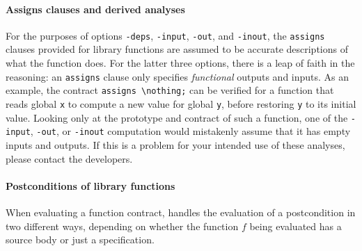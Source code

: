 \documentclass{frama-c-book}
\begin{document}
\paragraph{Assigns clauses and derived analyses}

For the purposes of options \lstinline|-deps|, \lstinline|-input|,
\lstinline|-out|, and \lstinline|-inout|, the \lstinline|assigns|
clauses provided for
library functions are assumed to be accurate descriptions of what the
function does. For the latter three options, there is a
leap of faith in the reasoning: an \lstinline|assigns| clause only
specifies {\em functional} outputs and inputs. As an example, the contract
\lstinline|assigns \nothing;| can be verified for a function that reads
global \lstinline|x| to compute a new value for global \lstinline|y|,
before restoring \lstinline|y| to its initial value. Looking only at the
prototype and contract of such a function, one of the \lstinline|-input|,
\lstinline|-out|, or \lstinline|-inout| computation would mistakenly
assume that it has empty inputs and outputs.
%
If this is a problem for your intended use of these analyses,
please contact the developers.



\paragraph{Postconditions of library functions}

When evaluating a function contract, \Eva{} handles the
evaluation of a postcondition in two different ways, depending on
whether the function $f$ being evaluated has a source body or just a
specification.
\end{document}
